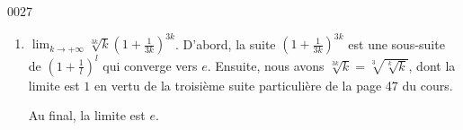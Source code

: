 \begin{corrige}{0027}
\begin{enumerate}
\item 
$ \lim_{k \to  +\infty } \sqrt[3k]{k} (1 + \frac{1}{3k})^{3k} $.
D'abord, la suite $\left( 1+\frac{ 1 }{ 3k } \right)^{3k}$ est une sous-suite de $\left( 1+\frac{ 1 }{ l } \right)^l$ qui converge vers $e$. Ensuite, nous avons $\sqrt[3k]{k}=\sqrt[3]{\sqrt[k]{k}}$, dont la limite est $1$ en vertu de la troisième suite particulière de la page 47 du cours.

Au final, la limite est $e$.

\end{enumerate}

\end{corrige}
